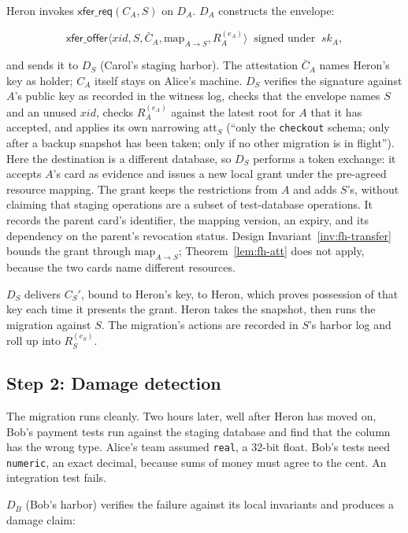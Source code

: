 \documentclass[11pt,a4paper]{article}
\theoremstyle{definition}
\theoremstyle{remark}
\begin{document}
Heron invokes $\mathsf{xfer\_req}(C_A, S)$ on $D_A$. $D_A$ constructs the envelope:

\[
\mathsf{xfer\_offer}\langle \mathit{xid}, S, \bar{C}_A, \mathrm{map}_{A\to S}, R_A^{(e_A)} \rangle \;\;\text{signed under}\;\; \mathit{sk}_A,
\]

and sends it to $D_S$ (Carol's staging harbor). The attestation $\bar{C}_A$ names Heron's key as holder; $C_A$ itself stays on Alice's machine. $D_S$ verifies the signature against $A$'s public key as recorded in the witness log, checks that the envelope names $S$ and an unused $\mathit{xid}$, checks $R_A^{(e_A)}$ against the latest root for $A$ that it has accepted, and applies its own narrowing $\mathrm{att}_S$ (``only the \texttt{checkout} schema; only after a backup snapshot has been taken; only if no other migration is in flight''). Here the destination is a different database, so $D_S$ performs a token
exchange: it accepts $A$'s card as evidence and issues a new local grant under
the pre-agreed resource mapping. The grant keeps the restrictions from $A$ and
adds $S$'s, without claiming that staging operations are a subset of
test-database operations. It records the parent card's identifier, the mapping version, an
expiry, and its dependency on the parent's revocation status.
Design Invariant~\ref{inv:fh-transfer} bounds the grant through $\mathrm{map}_{A\to S}$; Theorem~\ref{lem:fh-att} does not apply, because the two cards name different resources.

$D_S$ delivers $C_S'$, bound to Heron's key, to Heron, which proves possession of that key each time it presents the grant. Heron takes the snapshot, then runs the migration against $S$. The migration's actions are recorded in $S$'s harbor log and roll up into $R_S^{(e_S)}$.

\subsection{Step 2: Damage detection}\label{sec:fh-ex-damage}

The migration runs cleanly. Two hours later, well after Heron has moved on, Bob's payment tests run against the staging database and find that the column has the wrong type. Alice's team assumed \texttt{real}, a 32-bit float. Bob's tests need \texttt{numeric}, an exact decimal, because sums of money must agree to the cent. An integration test fails.

$D_B$ (Bob's harbor) verifies the failure against its local invariants and produces a damage claim:
\end{document}
